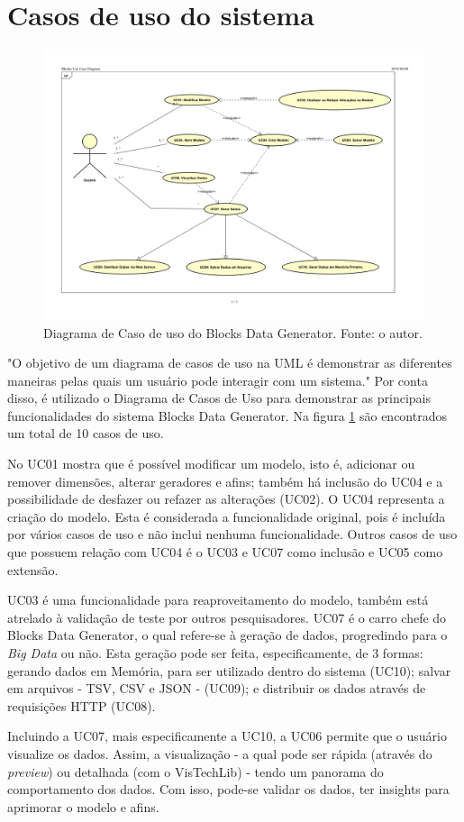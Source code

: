 \documentclass[
	12pt,				%
	openright,			%
	twoside,			%
	a4paper,			%
	english,			%
	brazil				%
	]{abntex2}
\begin{document}
	\section{Casos de uso do sistema}
		\begin{figure}[h!]
			\centering
			\includegraphics[width=\linewidth]{./figures/prototipo/diagramaUC.png}
			\caption{Diagrama de Caso de uso do Blocks Data Generator. Fonte: o autor.}
			\label{fig:diagramaUC}
		\end{figure}
		"O objetivo de um diagrama de casos de uso na UML é demonstrar as diferentes maneiras pelas quais um usuário pode interagir com um sistema." \cite{UCdefinition}
		Por conta disso, é utilizado o Diagrama de Casos de Uso para demonstrar as principais funcionalidades do sistema Blocks Data Generator.
		Na figura \ref{fig:diagramaUC} são encontrados um total de 10 casos de uso.
		\par
		No UC01 mostra que é possível modificar um modelo, isto é, adicionar ou remover dimensões, alterar geradores e afins; também há inclusão do UC04 e a possibilidade de desfazer ou refazer as alterações (UC02).
		O UC04 representa a criação do modelo. 
		Esta é considerada a funcionalidade original, pois é incluída por vários casos de uso e não inclui nenhuma funcionalidade.
		Outros casos de uso que possuem relação com UC04 é o UC03 e UC07 como inclusão e UC05 como extensão.
		\par
		UC03 é uma funcionalidade para reaproveitamento do modelo, também está atrelado à validação de teste por outros pesquisadores.
		UC07 é o carro chefe do Blocks Data Generator, o qual refere-se à geração de dados, progredindo para o \emph{Big Data} ou não.
		Esta geração pode ser feita, especificamente, de 3 formas: gerando dados em Memória, para ser utilizado dentro do sistema (UC10);
			salvar em arquivos - TSV, CSV e JSON - (UC09);
			e distribuir os dados através de requisições HTTP (UC08).
		\par
		Incluindo a UC07, mais especificamente a UC10, a UC06 permite que o usuário visualize os dados. 
		Assim, a visualização - a qual pode ser rápida (através do \emph{preview}) ou detalhada (com o VisTechLib) - tendo um panorama do comportamento dos dados. 
		Com isso, pode-se validar os dados, ter insights para aprimorar o modelo e afins.
\end{document}
